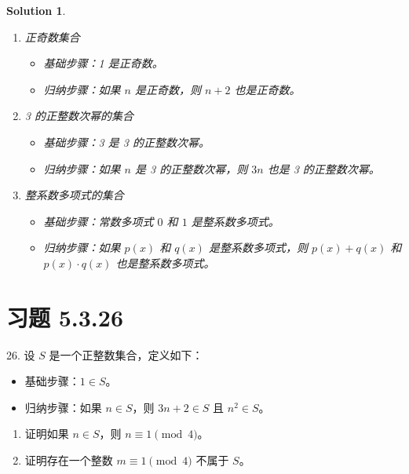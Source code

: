 \documentclass[UTF8]{report}
\newtheorem{solution}{Solution}
\theoremstyle{MyLineTheoremStyle} %
\theoremstyle{MyBlockTheoremStyle} %
\theoremstyle{MySubsubsectionStyle} %
\begin{document}
\begin{solution}
    \begin{enumerate}
        \item 正奇数集合
        \begin{itemize}
            \item 基础步骤：1 是正奇数。
            \item 归纳步骤：如果 $n$ 是正奇数，则 $n+2$ 也是正奇数。
        \end{itemize}

        \item 3 的正整数次幂的集合
        \begin{itemize}
            \item 基础步骤：3 是 3 的正整数次幂。
            \item 归纳步骤：如果 $n$ 是 3 的正整数次幂，则 $3n$ 也是 3 的正整数次幂。
        \end{itemize}

        \item 整系数多项式的集合
        \begin{itemize}
            \item 基础步骤：常数多项式 $0$ 和 $1$ 是整系数多项式。
            \item 归纳步骤：如果 $p(x)$ 和 $q(x)$ 是整系数多项式，则 $p(x) + q(x)$ 和 $p(x) \cdot q(x)$ 也是整系数多项式。
        \end{itemize}
    \end{enumerate}
\end{solution}

\section{习题 5.3.26}
26. 设 $S$ 是一个正整数集合，定义如下：
\begin{itemize}
    \item 基础步骤：$1 \in S$。
    \item 归纳步骤：如果 $n \in S$，则 $3n+2 \in S$ 且 $n^2 \in S$。
\end{itemize}
\begin{enumerate}
    \item 证明如果 $n \in S$，则 $n \equiv 1 \pmod{4}$。
    \item 证明存在一个整数 $m \equiv 1 \pmod{4}$ 不属于 $S$。
\end{enumerate}
\end{document}
